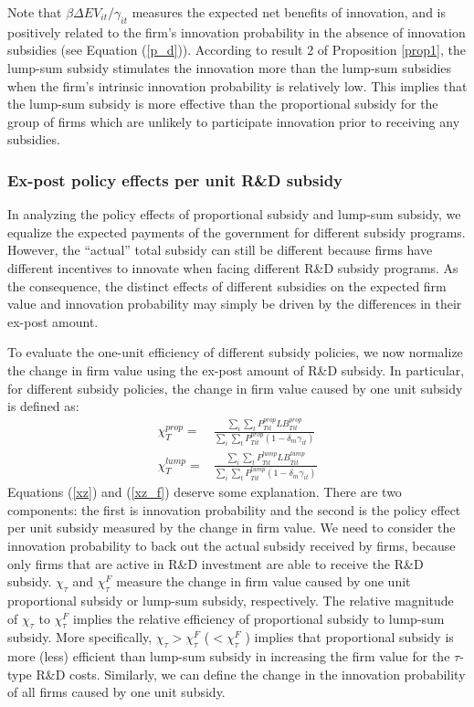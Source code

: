 \documentclass[11pt]{article}
\begin{document}
Note that $\beta \Delta EV_{it}/\gamma_{it}$ measures the expected net benefits of innovation, and is positively related to the firm's innovation probability in the absence of innovation subsidies (see Equation (\ref{p_d})). According to result 2 of Proposition \ref{prop1}, the lump-sum subsidy stimulates the innovation more than the lump-sum subsidies when the firm's intrinsic innovation probability is relatively low. This implies that the lump-sum subsidy is more effective than the proportional subsidy for the group of firms which are unlikely to participate innovation prior to receiving any subsidies. 

\subsubsection{Ex-post policy effects per unit R\&D subsidy} 
In analyzing the policy effects of proportional subsidy and lump-sum subsidy, we equalize the expected payments of the government for different subsidy programs. However, the ``actual'' total subsidy can still be different because firms have different incentives to innovate when facing different R\&D subsidy programs. As the consequence, the distinct effects of different subsidies on the expected firm value and innovation probability may simply be driven by the differences in their ex-post amount. 

To evaluate the one-unit efficiency of different subsidy policies, we now normalize the change in firm value using the ex-post amount of R\&D subsidy. In particular, for different subsidy policies, the change in firm value caused by one unit subsidy is defined as:
\begin{align}
    \chi_T^{prop}
        =&\frac{\sum_{i}\sum_{t}P_{Tit}^{prop}LB_{Tit}^{prop}}{\sum_{i}\sum_{t}P_{Tit}^{prop}(1-\delta_m \gamma_{it})}\label{xz} \\ 
    \chi_{T}^{lump}
        =&\frac{\sum_{i}\sum_{t}P_{Tit}^{lump}LB_{Tit}^{lump}}{\sum_{i}\sum_{t}P_{Tit}^{lump}(1-\delta_m \gamma_{it})} \label{xz_f}
\end{align}
Equations (\ref{xz}) and (\ref{xz_f}) deserve some explanation. There are two components: the first is innovation probability and the second is the policy effect per unit subsidy measured by the change in firm value. We need to consider the innovation probability to back out the actual subsidy received by firms, because only firms that are active in R\&D investment are able to receive the R\&D subsidy. $\chi_\tau$ and $\chi_\tau^F$ measure the change in firm value caused by one unit proportional subsidy or lump-sum subsidy, respectively. The relative magnitude of $\chi_\tau$ to $\chi_\tau^F$ implies the relative efficiency of proportional subsidy to lump-sum subsidy. More specifically, $\chi_\tau>\chi_\tau^F$ ($<\chi_\tau^F$ ) implies that proportional subsidy is more (less) efficient than lump-sum subsidy in increasing the firm value for the $\tau$-type R\&D costs. Similarly, we can define the change in the innovation probability of all firms caused by one unit subsidy.
\end{document}
